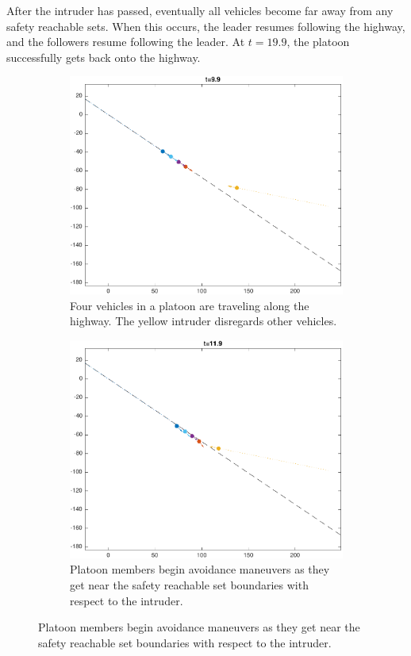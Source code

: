 After the intruder has passed, eventually all vehicles become far away from any safety reachable sets. When this occurs, the leader resumes following the highway, and the followers resume following the leader. At $t=19.9$, the platoon successfully gets back onto the highway.

\begin{figure}
    \centering
    \begin{subfigure}[t]{0.45\textwidth} \label{subfig:in_100}
        \includegraphics[width=\textwidth]{fig/in_100}
        \caption{Four vehicles in a platoon are traveling along the highway. The yellow intruder disregards other vehicles.}
    \end{subfigure}
    \begin{subfigure}[t]{0.45\textwidth} \label{subfig:in_120}
        \includegraphics[width=\textwidth]{fig/in_120}
        \caption{Platoon members begin avoidance maneuvers as they get near the safety reachable set boundaries with respect to the intruder.}
    \end{subfigure}


\end{figure}

